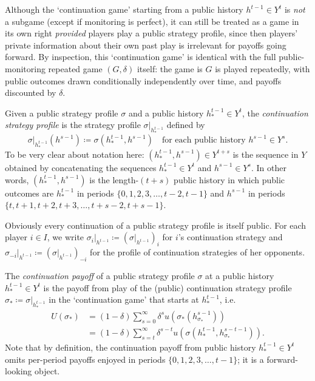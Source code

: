 Although the `continuation game' starting from a public history $h^{t-1} \in Y^t$ is \emph{not} a subgame (except if monitoring is perfect), it can still be treated as a game in its own right \emph{provided} players play a public strategy profile, since then players' private information about their own past play is irrelevant for payoffs going forward. By inspection, this `continuation game' is identical with the full public-monitoring repeated game $(G,\delta)$ itself: the game is $G$ is played repeatedly, with public outcomes drawn conditionally independently over time, and payoffs discounted by $\delta$.

Given a public strategy profile $\sigma$ and a public history $h_{*}^{t-1} \in Y^t$, the \emph{continuation strategy profile} is the strategy profile $\sigma|_{h_{*}^{t-1}}$ defined by
%
\begin{equation*}
	\left.\sigma\right|_{h_{*}^{t-1}}\left( h^{s-1} \right)
	\coloneqq \sigma\left( h_{*}^{t-1}, h^{s-1} \right)
	\quad \text{for each public history $h^{s-1} \in Y^s$.}
\end{equation*}
%
To be very clear about notation here: $(h_{*}^{t-1}, h^{s-1}) \in Y^{t+s}$ is the sequence in $Y$ obtained by concatenating the sequences $h_{*}^{t-1} \in Y^t$ and $h^{s-1} \in Y^s$. In other words, $(h_{*}^{t-1}, h^{s-1})$ is the length-$(t+s)$ public history in which public outcomes are $h_{*}^{t-1}$ in periods $\{0,1,2,3,\dots,t-2,t-1\}$ and $h^{s-1}$ in periods $\{t,t+1,t+2,t+3,\dots,t+s-2,t+s-1\}$.

Obviously every continuation of a public strategy profile is itself public. For each player $i \in I$, we write $\sigma_i|_{h^{t-1}} \coloneqq \left( \sigma|_{h^{t-1}} \right)_i$ for $i$'s continuation strategy and $\sigma_{-i}|_{h^{t-1}} \coloneqq \left( \sigma|_{h^{t-1}} \right)_{-i}$ for the profile of continuation strategies of her opponents.

The \emph{continuation payoff} of a public strategy profile $\sigma$ at a public history $h_{*}^{t-1} \in Y^t$ is the payoff from play of the (public) continuation strategy profile $\sigma_{*} \coloneqq \sigma|_{h_{*}^{t-1}}$ in the `continuation game' that starts at $h_{*}^{t-1}$, i.e.
%
\begin{align*}
	U\left( \sigma_{*} \right)
	&= (1-\delta) \sum_{s=0}^\infty \delta^s u\left( \sigma_{*}\left(h^{s-1}_{\sigma_{*}}\right) \right)
	\\
	&= (1-\delta) \sum_{s=t}^\infty \delta^{s-t} u\left( \sigma\left(h_{*}^{t-1},h^{s-t-1}_{\sigma_{*}} \right) \right) .
\end{align*}
%
Note that by definition, the continuation payoff from public history $h_{*}^{t-1} \in Y^t$ omits per-period payoffs enjoyed in periods $\{0,1,2,3,\dots,t-1\}$; it is a forward-looking object.

